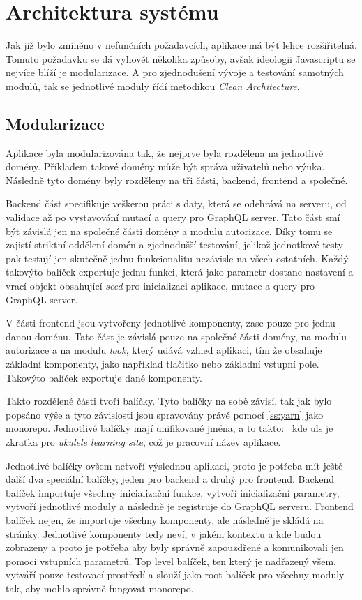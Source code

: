 \section{Architektura systému}
\label{sc:system_architecture}
Jak již bylo zmíněno v nefunčních požadavcích, aplikace má být lehce rozšiřitelná. Tomuto požadavku se dá vyhovět několika způsoby, avšak ideologii Javascriptu se nejvíce blíží je modularizace. A pro zjednodušení vývoje a testování samotných modulů, tak se jednotlivé moduly řídí metodikou \emph{Clean Architecture}.

\subsection{Modularizace}
Aplikace byla modularizována tak, že nejprve byla rozdělena na jednotlivé domény. Příkladem takové domény může být správa uživatelů nebo výuka. Následně tyto domény byly rozděleny na tři části, backend, frontend a společné.

Backend část specifikuje veškerou práci s daty, která se odehrává na serveru, od validace až po vystavování mutací a query pro GraphQL server. Tato část smí být závislá jen na společné části domény a modulu autorizace. Díky tomu se zajistí striktní oddělení domén a zjednodušší testování, jelikož jednotkové testy pak testují jen skutečně jednu funkcionalitu nezávisle na všech ostatních. Každý takovýto balíček exportuje jednu funkci, která jako parametr dostane nastavení a vrací objekt obsahující \emph{seed} pro inicializaci aplikace, mutace a query pro GraphQL server.

V části frontend jsou vytvořeny jednotlivé komponenty, zase pouze pro jednu danou doménu. Tato část je závislá pouze na společné části domény, na modulu autorizace a na modulu \emph{look}, který udává vzhled aplikaci, tím že obsahuje základní komponenty, jako například tlačitko nebo základní vstupní pole. Takovýto balíček exportuje dané komponenty.

Takto rozdělené části tvoří balíčky. Tyto balíčky na sobě závisí, tak jak bylo popsáno výše a tyto závislosti jsou spravovány právě pomocí \ref{ss:yarn} jako monorepo. Jednotlivé balíčky mají unifikované jména, a to takto:~ kde uls je zkratka pro \emph{ukulele learning site}, což je pracovní název aplikace.

Jednotlivé balíčky ovšem netvoří výslednou aplikaci, proto je potřeba mít ještě další dva speciální balíčky, jeden pro backend a druhý pro frontend. Backend balíček importuje všechny inicializační funkce, vytvoří inicializační parametry, vytvoří jednotlivé moduly a následně je registruje do GraphQL serveru. Frontend balíček nejen, že importuje všechny komponenty, ale následně je skládá na stránky. Jednotlivé komponenty tedy neví, v jakém kontextu a kde budou zobrazeny a proto je potřeba aby byly správně zapouzdřené a komunikovali jen pomocí vstupních parametrů. Top level balíček, ten který je nadřazený všem, vytváří pouze testovací prostředí a slouží jako root balíček pro všechny moduly tak, aby mohlo správně fungovat monorepo.


